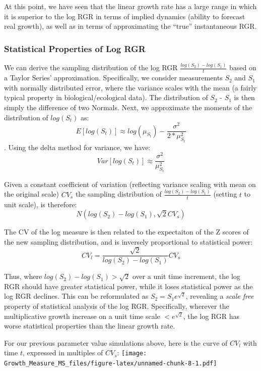 \documentclass[]{article}
\begin{document}
At this point, we have seen that the linear growth rate has a large
range in which it is superior to the log RGR in terms of implied
dynamics (ability to forecast real growth), as well as in terms of
approximating the ``true'' instantaneous RGR.

\subsubsection{Statistical Properties of Log
RGR}\label{statistical-properties-of-log-rgr}

We can derive the sampling distribution of the log RGR
\(\frac{log(S_2) - log(S_1)}{t}\) based on a Taylor Series'
approximation. Specifically, we consider measurements \(S_2\) and
\(S_1\) with normally distributed error, where the variance scales with
the mean (a fairly typical property in biological/ecological data). The
distribution of \(S_2\) - \(S_1\) is then simply the difference of two
Normals. Next, we approximate the moments of the distribution of
\(log(S_t)\) as:
\[E[log(S_t)] \approx log(\mu_{S_t}) - \frac{\sigma^2}{2*\mu_{S_t}^2}\].
Using the delta method for variance, we have:
\[Var[log(S_t)] \approx \frac{\sigma^2}{\mu_{S_t}^2}\]

Given a constant coefficient of variation (reflecting variance scaling
with mean on the original scale) \(CV_s\) the sampling distribution of
\(\frac{log(S_2) - log(S_1)}{t}\) (setting \(t\) to unit scale), is
therefore: \[ N(log(S_2) - log(S_1), \sqrt2CV_s)\]

The CV of the log measure is then related to the expectaiton of the Z
scores of the new sampling distribution, and is inversely proportional
to statistical power: \[CV_l =\frac{\sqrt2}{log(S_2) - log(S_1)}CV_s\]

Thus, where \(log(S_2) - log(S_1) > \sqrt2\) over a unit time increment,
the log RGR should have greater statistical power, while it loses
statistical power as the log RGR declines. This can be reformulated as
\(S_2=S_1e^{\sqrt2}\), revealing a \emph{scale free} property of
statistical analysis of the log RGR. Specifically, wherever the
multiplicative growth increase on a unit time scale \(<e^{\sqrt2}\), the
log RGR has worse statistical properties than the linear growth rate.

For our previous parameter value simulations above, here is the curve of
\(CV_l\) with time \(t\), expressed in multiples of \(CV_s\):
\texttt{[image: Growth\_Measure\_MS\_files/figure-latex/unnamed-chunk-8-1.pdf]}
\end{document}
